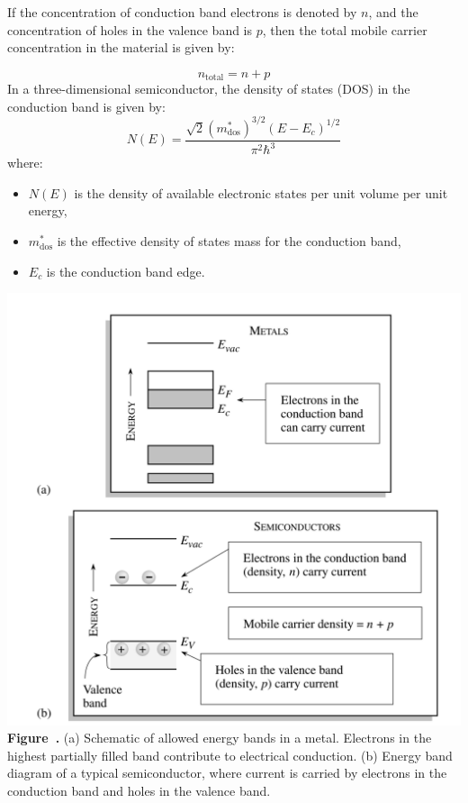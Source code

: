 If the concentration of conduction band electrons is denoted by \( n \), and the concentration of holes in the valence band is \( p \), then the total mobile carrier concentration in the material is given by:

\begin{equation}
	n_{\text{total}} = n + p
\end{equation}
In a three-dimensional semiconductor, the density of states (DOS) in the conduction band is given by:
\begin{equation}
	N(E) = \frac{\sqrt{2} \left( m^*_{\text{dos}} \right)^{3/2} \left( E - E_c \right)^{1/2}}{\pi^2 \hbar^3}
\end{equation}
\noindent
where:
\begin{itemize}
	\item \( N(E) \) is the density of available electronic states per unit volume per unit energy,
	\item \( m^*_{\text{dos}} \) is the effective density of states mass for the conduction band,
	\item \( E_c \) is the conduction band edge.
\end{itemize}

\begin{center}
	\begin{minipage}{0.8\textwidth}
		\centering
		\includegraphics[width=\textwidth]{img/scheme_allowed_energy.png}
		\\[0.5em]
		\textbf{Figure~\thefigure.}  (a) Schematic of allowed energy bands in a metal. Electrons in the highest partially filled band contribute to electrical conduction.
		(b) Energy band diagram of a typical semiconductor, where current is carried by electrons in the conduction band and holes in the valence band.
		\label{fig:allowed_energy_bands}
	\end{minipage}
\end{center}


